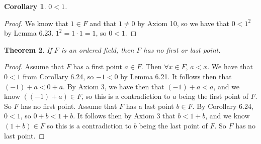 \documentclass[12pt]{article}
\renewcommand{\_}[1]{\underline{ #1 }}
\newtheorem{theorem}{Theorem}[section]
\newtheorem{corollary}[theorem]{Corollary}
\theoremstyle{definition}
\numberwithin{equation}{subsection}
\begin{document}
\begin{corollary}  $0 < 1$.
\end{corollary}

\begin{proof}
We know that $1 \in F$ and that $1 \not = 0$ by Axiom 10, so we have that $0 < 1^2$ by Lemma 6.23. $1^2 = 1 \cdot 1 = 1$, so $0 < 1$.
\end{proof}

\begin{theorem}  If $F$ is an ordered field, then $F$ has no first or last point.  
\end{theorem}

\begin{proof}
Assume that $F$ has a first point $a \in F$. Then $\forall x \in F$, $a < x$. We have that $0 < 1$ from Corollary 6.24, so $-1 < 0$ by Lemma 6.21. It follows then that $(-1) + a < 0 + a$. By Axiom 3, we have then that $(-1) + a < a$, and we know $((-1) + a) \in F$, so this is a contradiction to $a$ being the first point of $F$. So $F$ has no first point. \newline
Assume that $F$ has a last point $b \in F$. By Corollary 6.24, $0 < 1$, so $0 + b < 1 + b$. It follows then by Axiom 3 that $b < 1 + b$, and we know $(1 + b) \in F$ so this is a contradiction to $b$ being the last point of $F$. So $F$ has no last point.
\end{proof}
\end{document}
